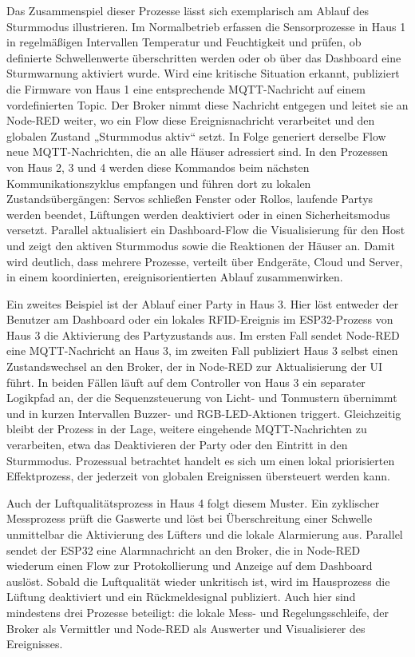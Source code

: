 Das Zusammenspiel dieser Prozesse lässt sich exemplarisch am Ablauf des Sturmmodus illustrieren. Im Normalbetrieb erfassen die Sensorprozesse in Haus 1 in regelmäßigen Intervallen Temperatur und Feuchtigkeit und prüfen, ob definierte Schwellenwerte überschritten werden oder ob über das Dashboard eine Sturmwarnung aktiviert wurde. Wird eine kritische Situation erkannt, publiziert die Firmware von Haus 1 eine entsprechende MQTT-Nachricht auf einem vordefinierten Topic. Der Broker nimmt diese Nachricht entgegen und leitet sie an Node-RED weiter, wo ein Flow diese Ereignisnachricht verarbeitet und den globalen Zustand „Sturmmodus aktiv“ setzt. In Folge generiert derselbe Flow neue MQTT-Nachrichten, die an alle Häuser adressiert sind. In den Prozessen von Haus 2, 3 und 4 werden diese Kommandos beim nächsten Kommunikationszyklus empfangen und führen dort zu lokalen Zustandsübergängen: Servos schließen Fenster oder Rollos, laufende Partys werden beendet, Lüftungen werden deaktiviert oder in einen Sicherheitsmodus versetzt. Parallel aktualisiert ein Dashboard-Flow die Visualisierung für den Host und zeigt den aktiven Sturmmodus sowie die Reaktionen der Häuser an. Damit wird deutlich, dass mehrere Prozesse, verteilt über Endgeräte, Cloud und Server, in einem koordinierten, ereignisorientierten Ablauf zusammenwirken.

Ein zweites Beispiel ist der Ablauf einer Party in Haus 3. Hier löst entweder der Benutzer am Dashboard oder ein lokales RFID-Ereignis im ESP32-Prozess von Haus 3 die Aktivierung des Partyzustands aus. Im ersten Fall sendet Node-RED eine MQTT-Nachricht an Haus 3, im zweiten Fall publiziert Haus 3 selbst einen Zustandswechsel an den Broker, der in Node-RED zur Aktualisierung der UI führt. In beiden Fällen läuft auf dem Controller von Haus 3 ein separater Logikpfad an, der die Sequenzsteuerung von Licht- und Tonmustern übernimmt und in kurzen Intervallen Buzzer- und RGB-LED-Aktionen triggert. Gleichzeitig bleibt der Prozess in der Lage, weitere eingehende MQTT-Nachrichten zu verarbeiten, etwa das Deaktivieren der Party oder den Eintritt in den Sturmmodus. Prozessual betrachtet handelt es sich um einen lokal priorisierten Effektprozess, der jederzeit von globalen Ereignissen übersteuert werden kann.

Auch der Luftqualitätsprozess in Haus 4 folgt diesem Muster. Ein zyklischer Messprozess prüft die Gaswerte und löst bei Überschreitung einer Schwelle unmittelbar die Aktivierung des Lüfters und die lokale Alarmierung aus. Parallel sendet der ESP32 eine Alarmnachricht an den Broker, die in Node-RED wiederum einen Flow zur Protokollierung und Anzeige auf dem Dashboard auslöst. Sobald die Luftqualität wieder unkritisch ist, wird im Hausprozess die Lüftung deaktiviert und ein Rückmeldesignal publiziert. Auch hier sind mindestens drei Prozesse beteiligt: die lokale Mess- und Regelungsschleife, der Broker als Vermittler und Node-RED als Auswerter und Visualisierer des Ereignisses.

